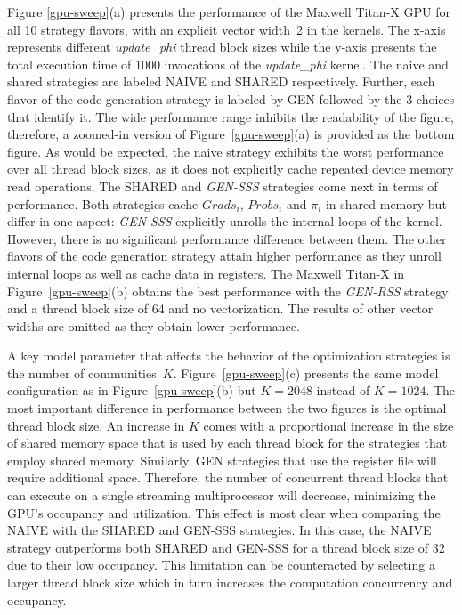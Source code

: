 Figure \ref{gpu-sweep}(a) presents the performance of the Maxwell \mbox{Titan-X} GPU
for all 10 strategy flavors, with an explicit vector width~2 in the kernels. The
x-axis represents different \textit{update\_phi} thread block sizes while the y-axis presents
the total execution time of 1000 invocations of the \textit{update\_phi} kernel. The
naive and shared strategies are labeled NAIVE and SHARED respectively. Further,
each flavor of the code generation strategy is labeled by GEN followed by the 3
choices that identify it.
%
The wide performance range inhibits the readability of the figure,
therefore, a zoomed-in version of Figure~\ref{gpu-sweep}(a) is provided as the bottom figure. As would
be expected, the naive strategy exhibits the worst performance over all
thread block
sizes, as it does not explicitly cache repeated device memory read operations.
The SHARED and \textit{GEN-SSS} strategies come next in terms of performance.
Both strategies cache $Grads_i$, $Probs_i$ and $\pi_i$ in shared memory but
differ in one aspect: \textit{GEN-SSS} explicitly unrolls the internal
loops of the kernel. However, there is no significant performance difference
between them. The other flavors of the code generation strategy attain higher
performance as they unroll internal loops as well as cache data in
registers.
The Maxwell Titan-X in Figure~\ref{gpu-sweep}(b) obtains the best performance with the \textit{GEN-RSS}
strategy and a thread block size of 64 and no vectorization. The results of other
vector widths
are omitted as they obtain lower performance.

A key model parameter that affects the behavior of the optimization strategies
is the number of communities~$K$. Figure~\ref{gpu-sweep}(c) presents the
same model configuration as in Figure~\ref{gpu-sweep}(b) but $K=2048$
instead of $K=1024$. The most important difference in performance between the two figures is the optimal
thread block size. An increase in $K$ comes with a proportional increase in
the size of shared memory space that is used by each thread block for the
strategies that employ shared memory. Similarly, GEN strategies that use the
register file will require additional space. Therefore, the number of
concurrent thread blocks that can execute on a single streaming multiprocessor
will decrease, minimizing the GPU's occupancy and utilization. This effect is
most clear when comparing the NAIVE with the SHARED and GEN-SSS strategies. In
this case, the NAIVE strategy outperforms both SHARED and GEN-SSS for a
thread block
size of 32 due to their low occupancy. This limitation can be counteracted by
selecting a larger thread block size which in turn increases the computation
concurrency and occupancy.

